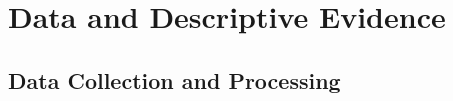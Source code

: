 \documentclass[11pt]{article}
\begin{document}



\section{Data and Descriptive Evidence \label{sec:data}}

\subsection{Data Collection and Processing} \label{subsec:data_collection}
\end{document}
